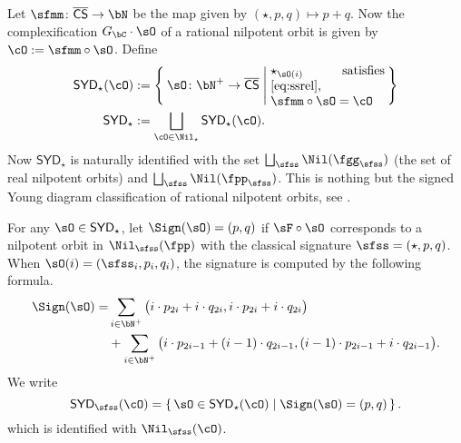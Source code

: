 \documentclass[12pt,a4paper]{amsart}
\def\SYD{{\mathsf{SYD}}}
\numberwithin{equation}{section}
\theoremstyle{remark}
\def\lsign{{}^l\mathrm{Sign}}
\begin{document}
Let
$\sfmm \colon \CCSS\rightarrow \bN$ be the map given by
$(\star,p,q)\mapsto p+q$. Now the  complexification
$\GC\cdot \sO$ of a rational nilpotent orbit is given by $\cO := \sfmm\circ \sO$.
Define
\[
  \begin{split}
  \SYD_{\star}(\cO) &:=\Set{\sO\colon \bN^{+}\rightarrow \CCSS| \begin{minipage}{9em}
      $\star_{\sO(i)}$ satisfies \eqref{eq:ssrel},\\
      $\sfmm\circ \sO = \cO$
      \end{minipage}
    }\\
    \SYD_{\star} &:= \bigsqcup_{\cO\in \Nil_{\star}} \SYD_{\star}(\cO).
  \end{split}
\]
Now $\SYD_{\star}$ is naturally identified with the set
$\bigsqcup_{\sfss}\Nil(\fgg_{\sfss})$ (the set of real nilpotent orbits)
and $\bigsqcup_{\sfss}\Nil(\fpp_{\sfss})$.
This is nothing but the signed Young diagram classification of rational
nilpotent orbits, see \cite{CM}.

For any $\sO\in \SYD_{\star}$, let $\Sign(\sO) = (p,q)$ if $\sF\circ \sO$
corresponds to a nilpotent orbit in $\Nil_{\sfss}(\fpp)$ with the classical
signature $\sfss=(\star,p,q)$. When $\sO(i)=(\sfss_{i},p_{i},q_{i})$, the
signature is computed by the following formula.
\[
  \begin{split}
    \Sign(\sO) = &
    \sum_{i\in \bN^{+}} \big(i \cdot p_{2i} + i \cdot q_{2i},
    i \cdot p_{2i}+i\cdot q_{2i}\big)\\
    &  +
    \sum_{i\in \bN^{+}} \big(i \cdot p_{2i-1} + (i-1)\cdot q_{2i-1},
    (i-1) \cdot p_{2i-1}+i \cdot q_{2i-1}\big).
  \end{split}
\]
We write
\[
\SYD_{\sfss}(\cO) = \set{\sO\in \SYD_{\star}(\cO)| \Sign(\sO)=(p,q)}.
\]
which is identified with $\Nil_{\sfss}(\cO)$.

\medskip
\end{document}
